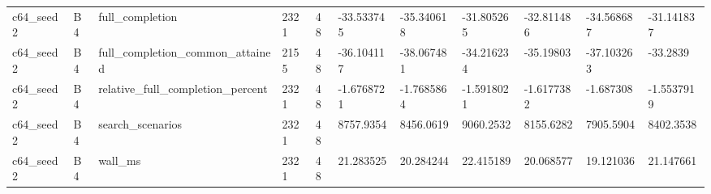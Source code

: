 \begin{longtable}{lllllllllll}
c64\_seed2 & B4 & full\_completion & 2321 & 48 & -33.533745 & -35.340618 & -31.805265 & -32.811486 & -34.568687 & -31.141837 \\
c64\_seed2 & B4 & full\_completion\_common\_attained & 2155 & 48 & -36.104117 & -38.067481 & -34.216234 & -35.19803 & -37.103263 & -33.2839 \\
c64\_seed2 & B4 & relative\_full\_completion\_percent & 2321 & 48 & -1.6768721 & -1.7685864 & -1.5918021 & -1.6177382 & -1.687308 & -1.5537919 \\
c64\_seed2 & B4 & search\_scenarios & 2321 & 48 & 8757.9354 & 8456.0619 & 9060.2532 & 8155.6282 & 7905.5904 & 8402.3538 \\
c64\_seed2 & B4 & wall\_ms & 2321 & 48 & 21.283525 & 20.284244 & 22.415189 & 20.068577 & 19.121036 & 21.147661 \\
\hline
\end{longtable}
